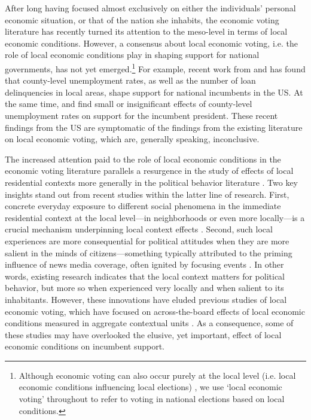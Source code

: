 \documentclass[12pt,a4paper]{article}
\begin{document}
	After long having focused almost exclusively on either the individuals’ personal economic situation, or that of the nation she inhabits, the economic voting literature has recently turned its attention to the meso-level in terms of local economic conditions. However, a consensus about local economic voting, i.e. the role of local economic conditions play in shaping support for national governments, has not yet emerged.\footnote{Although economic voting can also occur purely at the local level (i.e. local economic conditions influencing local elections) \cite[see e.g.][]{hopkins2017retrospective, burnett2017politics}, we use `local economic voting’ throughout to refer to voting in national elections based on local conditions.} For example, recent work from \cite{hansford2015reevaluating} and \cite{healy2017presidential} has found that county-level unemployment rates, as well as the number of loan delinquencies in local areas, shape support for national incumbents in the US. At the same time, \cite{hill2010economic} and \cite{wright2012unemployment} find small or insignificant effects of county-level unemployment rates on support for the incumbent president. These recent findings from the US are symptomatic of the findings from the existing literature on local economic voting, which are, generally speaking, inconclusive.
	
	The increased attention paid to the role of local economic conditions in the economic voting literature parallels a resurgence in the study of effects of local residential contexts more generally in the political behavior literature \cite[e.g.,][]{hopkins2010politicized,enos2016demolition}. Two key insights stand out from recent studies within the latter line of research. First, concrete everyday exposure to different social phenomena in the immediate residential context at the local level—in neighborhoods or even more locally—is a crucial mechanism underpinning local context effects \citep{moore2017defining,dinesen2015ethnic,enos2016demolition,hjorth2017influence}. Second, such local experiences are more consequential for political attitudes when they are more salient in the minds of citizens—something typically attributed to the priming influence of news media coverage, often ignited by focusing events \citep{hopkins2010politicized,legewie2013terrorist, davenport2015policy}. In other words, existing research indicates that the local context matters for political behavior, but more so when experienced very locally and when salient to its inhabitants. However, these innovations have eluded previous studies of local economic voting, which have focused on across-the-board effects of local economic conditions measured in aggregate contextual units \citep[though see][]{bisgaard2016reconsidering,healy2017presidential}. As a consequence, some of these studies may have overlooked the elusive, yet important, effect of local economic conditions on incumbent support. 
	
\end{document}
